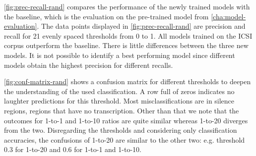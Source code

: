\documentclass[bsc,frontabs,parskip,deptreport]{infthesis}
\begin{document}
\autoref{fig:prec-recall-rand} compares the performance of the newly trained models with the baseline, which is the evaluation on the pre-trained model from \autoref{cha:model-evaluation}.
The data points displayed in \autoref{fig:prec-recall-rand} are precision and recall for 21 evenly spaced thresholds from 0 to 1. All models trained on the ICSI corpus outperform the baseline. There is little differences between the three new models. It is not possible to identify a best performing model since different models obtain the highest precision for different recalls.

\autoref{fig:conf-matrix-rand} shows a confusion matrix for different thresholds to deepen the understanding of the used classification. 
A row full of zeros indicates no laughter predictions for this threshold.
Most misclassifications are in silence regions, regions that have no transcription. Other than that we note that the outcomes for 1-to-1 and 1-to-10 ratios are quite similar whereas 1-to-20 diverges from the two. Disregarding the thresholds and considering only classification accuracies, the confusions of 1-to-20 are similar to the other two: e.g. threshold 0.3 for 1-to-20 and 0.6 for 1-to-1 and 1-to-10.
\end{document}
